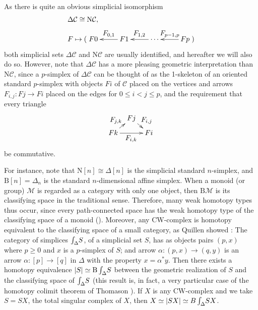 \documentclass[]{amsart}
\begin{document}
As there is quite an obvious simplicial isomorphism
$$ \begin{array}{l}\Delta{\ensuremath{\mathcal{C}}}\cong {\ensuremath{\mathrm{N}}}{\ensuremath{\mathcal{C}}},\\[6pt] F\mapsto
(\xymatrix@C=25pt{F0&\ar[l]_{\textstyle F_{0,1}}F1&\ar[l]_{\textstyle F_{1,2}}\cdots&\ar[l]_{
\textstyle F_{p-1,p}}Fp})
\end{array} $$
both simplicial sets $\Delta{\ensuremath{\mathcal{C}}}$ and ${\ensuremath{\mathrm{N}}}{\ensuremath{\mathcal{C}}}$ are usually identified, and hereafter we will also do
so. However, note that $\Delta{\ensuremath{\mathcal{C}}}$ has a more pleasing geometric interpretation than ${\ensuremath{\mathrm{N}}}{\ensuremath{\mathcal{C}}}$, since
a $p$-simplex of $\Delta{\ensuremath{\mathcal{C}}}$ can be thought of as the 1-skeleton of an oriented standard $p$-simplex
with objects $Fi$ of ${\ensuremath{\mathcal{C}}}$ placed on the vertices and arrows $F_{i,j}:Fj\to Fi$ placed on the edges
for $0\leq i < j\leq p$, and the requirement that every triangle
$$\xymatrix@C=7pt@R=7pt{ & Fj\ar[dr]^{\textstyle F_{i,j}} &\\
Fk \ar[rr]_{\textstyle F_{i,k}} \ar[ur]^{\textstyle F_{j,k}} && Fi }$$ be commutative.

For instance, note that ${\ensuremath{\mathrm{N}}}[n]\cong \Delta[n]$ is the simplicial standard $n$-simplex, and
${\ensuremath{\mathrm{B}}}[n]=\Delta_n$ is the standard $n$-dimensional affine simplex. When a monoid (or group)
${\mathcal M}$ is regarded as a category with only one object, then ${\ensuremath{\mathrm{B}}}{\mathcal M}$ is its
classifying space in the traditional sense. Therefore, many weak homotopy types thus occur, since
every path-connected space has the weak homotopy type  of the classifying space of a monoid
(\cite[Theorem 3.5]{fiedorowicz}). Moreover, any CW-complex is homotopy equivalent to the
classifying space of a small category, as Quillen showed \cite{quillen}: The category of simplices
$\int_\Delta {\hspace{-2pt}}S$, of a simplicial set $S$, has as objects pairs $(p,x)$ where $p\geq
0$ and $x$ is a $p$-simplex of $S$; and arrow $\alpha:(p,x)\rightarrow (q,y)$ is an arrow
$\alpha:[p]\to [q]$ in $\Delta$ with the property $x=\alpha^*y$. Then there exists a homotopy
equivalence $|S|\simeq {\ensuremath{\mathrm{B}}}\int_\Delta {\hspace{-2pt}}S$ between the geometric realization of $S$
and the classifying space of $\int_\Delta{\hspace{-2pt}}S$ (this result is, in fact, a very
particular case of the homotopy colimit theorem of Thomason \cite{thomason}). If $X$ is any
CW-complex and we take $S=SX$, the total singular complex of $X$, then $X\simeq |SX|\simeq
B\int_\Delta{\hspace{-2pt}} SX$.
\end{document}
